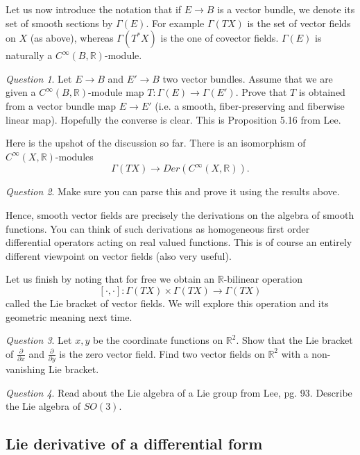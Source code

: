 \documentclass[12pt]{amsart}
\theoremstyle{remark}
\newtheorem{question}{Question}
\begin{document}
Let us now introduce the notation that if $E\to B$ is a vector bundle, we denote its set of smooth sections by $\Gamma(E)$. For example $\Gamma(TX)$ is the set of vector fields on $X$ (as above), whereas $\Gamma(T^*X)$ is the one of covector fields. $\Gamma(E)$ is naturally a $C^{\infty}(B,\mathbb{R})$-module.

\begin{question}\label{qsectionvect}
Let $E\to B$ and $E'\to B$ two vector bundles. Assume that we are given a $C^{\infty}(B,\mathbb{R})$-module map $T: \Gamma(E)\to \Gamma(E')$. Prove that $T$ is obtained from a vector bundle map $E\to E'$ (i.e. a smooth, fiber-preserving and fiberwise linear map). Hopefully the converse is clear. This is Proposition 5.16 from Lee.
\end{question}

Here is the upshot of the discussion so far. There is an isomorphism of $C^{\infty}(X,\mathbb{R})$-modules $$\Gamma(TX)\to Der(C^{\infty}(X,\mathbb{R})).$$

\begin{question}
Make sure you can parse this and prove it using the results above.
\end{question}


Hence, smooth vector fields are precisely the derivations on the algebra of smooth functions. You can think of such derivations as homogeneous first order differential operators acting on real valued functions. This is of course an entirely different viewpoint on vector fields (also very useful).

Let us finish by noting that for free we obtain an $\mathbb{R}$-bilinear operation $$[\cdot,\cdot]:\Gamma(TX)\times \Gamma(TX)\to \Gamma(TX)$$ called the Lie bracket of vector fields. We will explore this operation and its geometric meaning next time.

\begin{question}
Let $x,y$ be the coordinate functions on $\mathbb{R}^2$. Show that the Lie bracket of $\frac{\partial }{\partial x}$ and $\frac{\partial }{\partial y}$ is the zero vector field. Find two vector fields on $\mathbb{R}^2$ with a non-vanishing Lie bracket.
\end{question}

\begin{question}\label{qliealgebra}
Read about the Lie algebra of a Lie group from Lee, pg. 93. Describe the Lie algebra of $SO(3)$.
\end{question}

\subsection{Lie derivative of a differential form}
\end{document}
